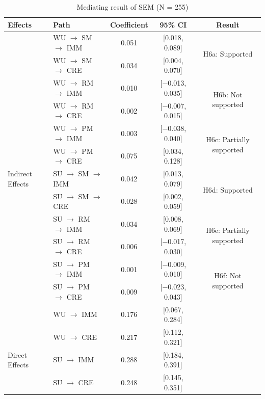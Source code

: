 \documentclass[authoryear,preprint,review,times,10pt]{elsarticle}
\begin{document}
\begin{table}[!htbp]
\centering
\captionsetup{font=normalsize, labelsep=period}
\setlength{\abovecaptionskip}{5pt}
\setlength{\belowcaptionskip}{0pt}
\caption{Mediating result of SEM (N = 255)}
\label{tab:mediation}
\small
\begin{threeparttable}
\begin{tabular*}{0.9\textwidth}{@{\extracolsep{\fill}}llccc}
\toprule
\textbf{Effects} & \textbf{Path} & \textbf{Coefficient} & \textbf{95\% CI} & \textbf{Result} \\
\midrule
 & WU $\rightarrow$ SM $\rightarrow$ IMM & 0.051 & [0.018, 0.089] & \multirow{2}{*}{H6a: Supported} \\
 & WU $\rightarrow$ SM $\rightarrow$ CRE & 0.034 & [0.004, 0.070] & \\
 & WU $\rightarrow$ RM $\rightarrow$ IMM & 0.010 & [$-$0.013, 0.035] & \multirow{2}{*}{H6b: Not supported} \\
 & WU $\rightarrow$ RM $\rightarrow$ CRE & 0.002 & [$-$0.007, 0.015] & \\
 & WU $\rightarrow$ PM $\rightarrow$ IMM & 0.003 & [$-$0.038, 0.040] & \multirow{2}{*}{H6c: Partially supported} \\
 & WU $\rightarrow$ PM $\rightarrow$ CRE & 0.075 & [0.034, 0.128] & \\
\multirow{-7}{*}{Indirect Effects} & SU $\rightarrow$ SM $\rightarrow$ IMM & 0.042 & [0.013, 0.079] & \multirow{2}{*}{H6d: Supported} \\
 & SU $\rightarrow$ SM $\rightarrow$ CRE & 0.028 & [0.002, 0.059] & \\
 & SU $\rightarrow$ RM $\rightarrow$ IMM & 0.034 & [0.008, 0.069] & \multirow{2}{*}{H6e: Partially supported} \\
 & SU $\rightarrow$ RM $\rightarrow$ CRE & 0.006 & [$-$0.017, 0.030] & \\
 & SU $\rightarrow$ PM $\rightarrow$ IMM & 0.001 & [$-$0.009, 0.010] & \multirow{2}{*}{H6f: Not supported} \\
 & SU $\rightarrow$ PM $\rightarrow$ CRE & 0.009 & [$-$0.023, 0.043] & \\
\midrule
 & WU $\rightarrow$ IMM & 0.176 & [0.067, 0.284] & \\
 & WU $\rightarrow$ CRE & 0.217 & [0.112, 0.321] & \\
\multirow{-3}{*}{Direct Effects} & SU $\rightarrow$ IMM & 0.288 & [0.184, 0.391] & \\
 & SU $\rightarrow$ CRE & 0.248 & [0.145, 0.351] & \\

\end{tabular*}
\end{threeparttable}
\end{table}
\end{document}
